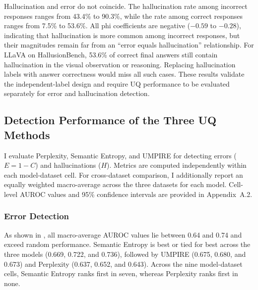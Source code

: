 Hallucination and error do not coincide. The hallucination rate among incorrect responses ranges from 43.4\% to 90.3\%, while the rate among correct responses ranges from 7.5\% to 53.6\%. All phi coefficients are negative ($-0.59$ to $-0.28$), indicating that hallucination is more common among incorrect responses, but their magnitudes remain far from an ``error equals hallucination'' relationship. For LLaVA on HallusionBench, 53.6\% of correct final answers still contain hallucination in the visual observation or reasoning. Replacing hallucination labels with answer correctness would miss all such cases. These results validate the independent-label design and require UQ performance to be evaluated separately for error and hallucination detection.

\subsection{Detection Performance of the Three UQ Methods}
\label{subsec:detection_performance}

I evaluate Perplexity, Semantic Entropy, and UMPIRE for detecting errors ($E=1-C$) and hallucinations ($H$). Metrics are computed independently within each model-dataset cell. For cross-dataset comparison, I additionally report an equally weighted macro-average across the three datasets for each model. Cell-level AUROC values and 95\% confidence intervals are provided in Appendix~A.2.

\subsubsection{Error Detection}

As shown in , all macro-average AUROC values lie between 0.64 and 0.74 and exceed random performance. Semantic Entropy is best or tied for best across the three models (0.669, 0.722, and 0.736), followed by UMPIRE (0.675, 0.680, and 0.673) and Perplexity (0.637, 0.652, and 0.643). Across the nine model-dataset cells, Semantic Entropy ranks first in seven, whereas Perplexity ranks first in none.

